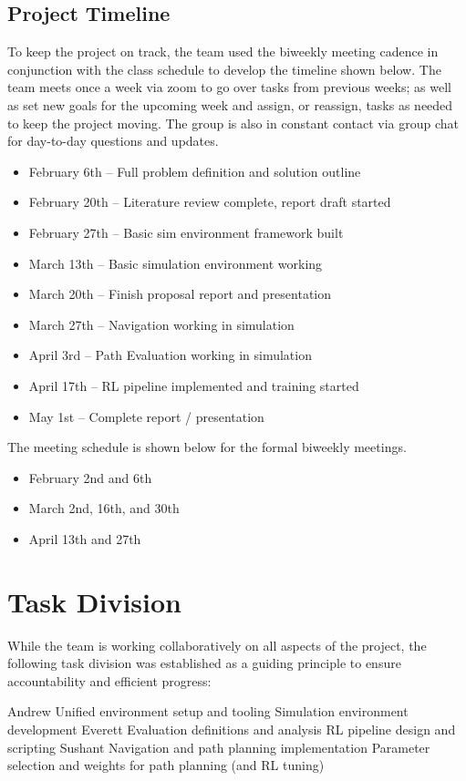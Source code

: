 \documentclass[conference]{IEEEtran}
\begin{document}
    \subsection{Project Timeline}
    To keep the project on track, the team used the biweekly meeting cadence in conjunction with the class schedule to develop the timeline shown below. The team meets once a week via zoom to go over tasks from previous weeks; as well as set new goals for the upcoming week and assign, or reassign, tasks as needed to keep the project moving. The group is also in constant contact via group chat for day-to-day questions and updates.
    \begin{itemize}
        \item February 6th – Full problem definition and solution outline
        \item February 20th – Literature review complete, report draft started
        \item February 27th – Basic sim environment framework built
        \item March 13th – Basic simulation environment working
        \item March 20th – Finish proposal report and presentation
        \item March 27th – Navigation working in simulation
        \item April 3rd – Path Evaluation working in simulation
        \item April 17th – RL pipeline implemented and training started
        \item May 1st – Complete report / presentation
    \end{itemize}
    The meeting schedule is shown below for the formal biweekly meetings.
    \begin{itemize}
        \item February 2nd and 6th
        \item March 2nd, 16th, and 30th
        \item April 13th and 27th
    \end{itemize}

\section{Task Division}
While the team is working collaboratively on all aspects of the project, the following task division was established as a guiding principle to ensure accountability and efficient progress:
\begin{outline}
    \1 Andrew
        \2 Unified environment setup and tooling
        \2 Simulation environment development
    \1 Everett
        \2 Evaluation definitions and analysis
        \2 RL pipeline design and scripting
    \1 Sushant
        \2 Navigation and path planning implementation
        \2 Parameter selection and weights for path planning (and RL tuning) 
\end{outline}
\end{document}
